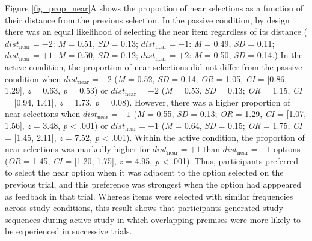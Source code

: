 \documentclass[floatsintext,man]{apa6}
\theoremstyle{definition}
\theoremstyle{definition}
\theoremstyle{definition}
\theoremstyle{remark}
\begin{document}
Figure \ref{fig_prop_near}A shows the proportion of near selections as a
function of their distance from the previous selection. In the passive
condition, by design there was an equal likelihood of selecting the near
item regardless of its distance (\(dist_{\text{near}}=-2\): \emph{M} =
0.51, \emph{SD} = 0.13; \(dist_{\text{near}}=-1\): \emph{M} = 0.49,
\emph{SD} = 0.11; \(dist_{\text{near}}=+1\): \emph{M} = 0.50, \emph{SD}
= 0.12; \(dist_{\text{near}}=+2\): \emph{M} = 0.50, \emph{SD} = 0.14.)
In the active condition, the proportion of near selections did not
differ from the passive condition when \(dist_{\text{near}}=-2\)
(\emph{M} = 0.52, \emph{SD} = 0.14; \emph{OR} = 1.05, \emph{CI} =
{[}0.86, 1.29{]}, \emph{z} = 0.63, \emph{p} = 0.53) or
\(dist_{\text{near}}=+2\) (\emph{M} = 0.53, \emph{SD} = 0.13; \emph{OR}
= 1.15, \emph{CI} = {[}0.94, 1.41{]}, \emph{z} = 1.73, \emph{p} = 0.08).
However, there was a higher proportion of near selections when
\(dist_{\text{near}}=-1\) (\emph{M} = 0.55, \emph{SD} = 0.13; \emph{OR}
= 1.29, \emph{CI} = {[}1.07, 1.56{]}, \emph{z} = 3.48, \emph{p}
\textless{} .001) or \(dist_{\text{near}}=+1\) (\emph{M} = 0.64,
\emph{SD} = 0.15; \emph{OR} = 1.75, \emph{CI} = {[}1.45, 2.11{]},
\emph{z} = 7.52, \emph{p} \textless{} .001). Within the active
condition, the proportion of near selections was markedly higher for
\(dist_{\text{near}}=+1\) than \(dist_{\text{near}}=-1\) options
(\emph{OR} = 1.45, \emph{CI} = {[}1.20, 1.75{]}, \emph{z} = 4.95,
\emph{p} \textless{} .001). Thus, participants preferred to select the
near option when it was adjacent to the option selected on the previous
trial, and this preference was strongest when the option had apppeared
as feedback in that trial. Whereas items were selected with similar
frequencies across study conditions, this result shows that participants
generated study sequences during active study in which overlapping
premises were more likely to be experienced in successive trials.
\end{document}
